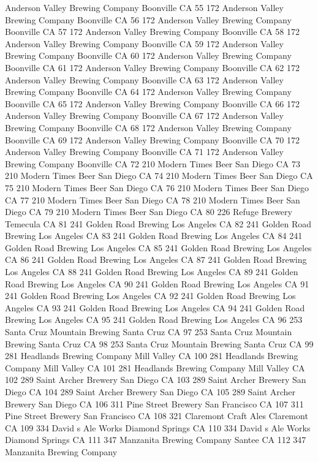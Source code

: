 \documentclass[]{article}
\begin{document}
Anderson Valley Brewing Company Boonville CA 55 172 Anderson Valley
Brewing Company Boonville CA 56 172 Anderson Valley Brewing Company
Boonville CA 57 172 Anderson Valley Brewing Company Boonville CA 58 172
Anderson Valley Brewing Company Boonville CA 59 172 Anderson Valley
Brewing Company Boonville CA 60 172 Anderson Valley Brewing Company
Boonville CA 61 172 Anderson Valley Brewing Company Boonville CA 62 172
Anderson Valley Brewing Company Boonville CA 63 172 Anderson Valley
Brewing Company Boonville CA 64 172 Anderson Valley Brewing Company
Boonville CA 65 172 Anderson Valley Brewing Company Boonville CA 66 172
Anderson Valley Brewing Company Boonville CA 67 172 Anderson Valley
Brewing Company Boonville CA 68 172 Anderson Valley Brewing Company
Boonville CA 69 172 Anderson Valley Brewing Company Boonville CA 70 172
Anderson Valley Brewing Company Boonville CA 71 172 Anderson Valley
Brewing Company Boonville CA 72 210 Modern Times Beer San Diego CA 73
210 Modern Times Beer San Diego CA 74 210 Modern Times Beer San Diego CA
75 210 Modern Times Beer San Diego CA 76 210 Modern Times Beer San Diego
CA 77 210 Modern Times Beer San Diego CA 78 210 Modern Times Beer San
Diego CA 79 210 Modern Times Beer San Diego CA 80 226 Refuge Brewery
Temecula CA 81 241 Golden Road Brewing Los Angeles CA 82 241 Golden Road
Brewing Los Angeles CA 83 241 Golden Road Brewing Los Angeles CA 84 241
Golden Road Brewing Los Angeles CA 85 241 Golden Road Brewing Los
Angeles CA 86 241 Golden Road Brewing Los Angeles CA 87 241 Golden Road
Brewing Los Angeles CA 88 241 Golden Road Brewing Los Angeles CA 89 241
Golden Road Brewing Los Angeles CA 90 241 Golden Road Brewing Los
Angeles CA 91 241 Golden Road Brewing Los Angeles CA 92 241 Golden Road
Brewing Los Angeles CA 93 241 Golden Road Brewing Los Angeles CA 94 241
Golden Road Brewing Los Angeles CA 95 241 Golden Road Brewing Los
Angeles CA 96 253 Santa Cruz Mountain Brewing Santa Cruz CA 97 253 Santa
Cruz Mountain Brewing Santa Cruz CA 98 253 Santa Cruz Mountain Brewing
Santa Cruz CA 99 281 Headlands Brewing Company Mill Valley CA 100 281
Headlands Brewing Company Mill Valley CA 101 281 Headlands Brewing
Company Mill Valley CA 102 289 Saint Archer Brewery San Diego CA 103 289
Saint Archer Brewery San Diego CA 104 289 Saint Archer Brewery San Diego
CA 105 289 Saint Archer Brewery San Diego CA 106 311 Pine Street Brewery
San Francisco CA 107 311 Pine Street Brewery San Francisco CA 108 321
Claremont Craft Ales Claremont CA 109 334 David s Ale Works Diamond
Springs CA 110 334 David s Ale Works Diamond Springs CA 111 347
Manzanita Brewing Company Santee CA 112 347 Manzanita Brewing Company
\end{document}
